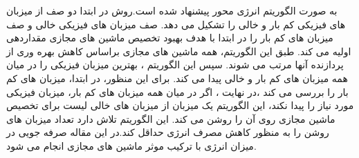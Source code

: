  به صورت الگوریتم انرژی محور
 پیشنهاد شده است.روش 
 در ابتدا دو صف از میزبان های فیزیکی کم بار و خالی را تشکیل می دهد. صف میزبان های فیزیکی خالی و صف میزبان های کم بار را در ابتدا با هدف بهبود تخصیص ماشین های مجازی مقداردهی اولیه می کند. طبق این الگوریتم، همه ماشین های مجازی براساس کاهش بهره وری از پردازنده آنها  مرتب می شوند. سپس این الگوریتم ، بهترین میزبان فیزیکی را در میان همه میزبان های کم بار و خالی پیدا می کند. برای این منظور، در ابتدا، میزبان های کم بار را بررسی می کند ،در نهایت ،  اگر در میان همه میزبان های کم بار، میزبان فیزیکی مورد نیاز را  پیدا نکند، این الگوریتم یک میزبان از میزبان های خالی لیست برای تخصیص ماشین مجازی روی آن را روشن می کند. این الگوریتم تلاش دارد تعداد میزبان های روشن را به منظور کاهش مصرف انرژی حداقل کند.در این مقاله صرفه جویی در میزان انرژی با ترکیب موثر ماشین های مجازی انجام می شود. 
